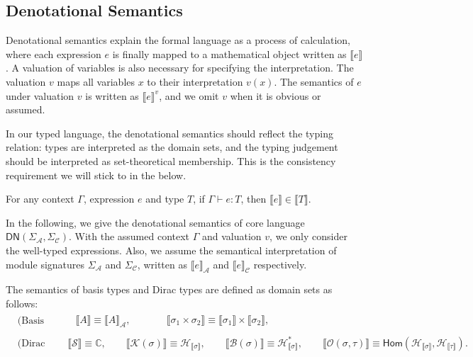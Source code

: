 \documentclass[manuscript, review, timestamp]{acmart}
\newcommand*{\Sc}{\mathcal{S}}
\newcommand*{\K}{\mathcal{K}}
\newcommand*{\B}{\mathcal{B}}
\newcommand*{\Op}{\mathcal{O}}
\newcommand*{\sem}[1]{{\llbracket #1 \rrbracket}}
\begin{document}
\subsection{Denotational Semantics}

Denotational semantics explain the formal language as a process of calculation, where each expression $e$ is finally mapped to a mathematical object written as $\sem{e}$.
A valuation of variables is also necessary for specifying the interpretation. The valuation $v$ maps all variables $x$ to their interpretation $v(x)$. The semantics of $e$ under valuation $v$ is written as $\sem{e}^v$, and we omit $v$ when it is obvious or assumed.

In our typed language, the denotational semantics should reflect the typing relation: types are interpreted as the domain sets, and the typing judgement should be interpreted as set-theoretical membership. This is the consistency requirement we will stick to in the below.

\begin{definition}
  For any context $\Gamma$, expression $e$ and type $T$, if $\Gamma \vdash e : T$, then $\sem{e} \in \sem{T}$.
\end{definition}



In the following, we give the denotational semantics of core language $\textsf{DN}(\Sigma_\mathcal{A}, \Sigma_\mathcal{C})$. With the assumed context $\Gamma$ and valuation $v$, we only consider the well-typed expressions.
Also, we assume the semantical interpretation of module signatures $\Sigma_\mathcal{A}$ and $\Sigma_\mathcal{C}$, written as $\sem{e}_\mathcal{A}$ and $\sem{e}_\mathcal{C}$ respectively.


\begin{definition}
  The semantics of basis types and Dirac types are defined as domain sets as follows:
  \begin{align*}
    & \text{(Basis Types)} && \begin{aligned}
      & \sem{A} \equiv \sem{A}_\mathcal{A},
      \qquad
      && \sem{\sigma_1 \times \sigma_2} \equiv \sem{\sigma_1} \times \sem{\sigma_2},
    \end{aligned} \\
    & \text{(Dirac Types)} && \begin{aligned}
      \sem{\Sc} \equiv \mathbb{C},
      \qquad
      \sem{\K(\sigma)} \equiv \mathcal{H}_{\sem{\sigma}}, 
      \qquad 
      \sem{\B(\sigma)} \equiv \mathcal{H}^*_{\sem{\sigma}},
      \qquad
      \sem{\Op(\sigma, \tau)} \equiv \textsf{Hom}(\mathcal{H}_\sem{\sigma}, \mathcal{H}_\sem{\tau}).
    \end{aligned}
  \end{align*}
\end{definition}
\end{document}
